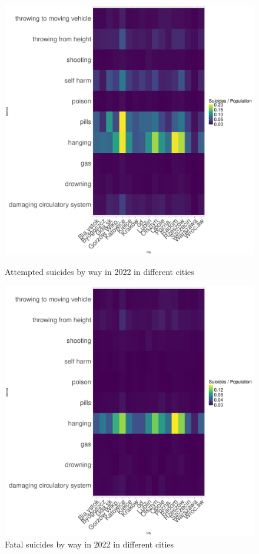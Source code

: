 \documentclass{article}
\begin{document}
\begin{figure}[H]
    \centering
    \begin{minipage}{0.65\textwidth}
        \includegraphics[width=\textwidth]{imgs/way_city_op-att-2022.pdf}
        \caption{Attempted suicides by way  in 2022 in different cities}
	\label{way_city_op-att-2022}
    \end{minipage}
    \hfill
    \begin{minipage}{0.65\textwidth}
        \includegraphics[width=\textwidth]{imgs/way_city_op-fat-2022.pdf}
        \caption{Fatal suicides by way  in 2022 in different cities}
	\label{way_city_op-fat-2022}
    \end{minipage}
\end{figure}
%
%
%
%
\end{document}
